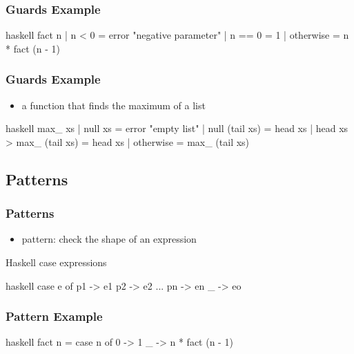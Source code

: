\documentclass[dvipsnames]{beamer}
\theoremstyle{plain}
\begin{document}
\begin{frame}[fragile]
  \frametitle{Guards Example}

  \begin{example}[factorial]
    \begin{pygments}{haskell}
fact n
  | n < 0 = error "negative parameter"
  | n == 0 = 1
  | otherwise = n * fact (n - 1)
    \end{pygments}
  \end{example}
\end{frame}

\begin{frame}[fragile]
  \frametitle{Guards Example}

  \begin{example}
    \begin{itemize}
      \item a function that finds the maximum of a list
    \end{itemize}

    \pause
    \begin{pygments}{haskell}
max_ xs
  | null xs = error "empty list"
  | null (tail xs) = head xs
  | head xs > max_ (tail xs) = head xs
  | otherwise = max_ (tail xs)
    \end{pygments}
  \end{example}
\end{frame}

\subsection{Patterns}

\begin{frame}[fragile]
  \frametitle{Patterns}

  \begin{itemize}
    \item \alert{pattern}: check the shape of an expression
  \end{itemize}

  \begin{block}{Haskell case expressions}
    \begin{pygments}{haskell}
case e of
  p1 -> e1
  p2 -> e2
  ...
  pn -> en
  _ -> eo
    \end{pygments}
  \end{block}
\end{frame}

\begin{frame}[fragile]
  \frametitle{Pattern Example}

  \begin{example}[factorial]
    \begin{pygments}{haskell}
fact n =
    case n of
      0 -> 1
      _ -> n * fact (n - 1)
    \end{pygments}
  \end{example}
\end{frame}
\end{document}
